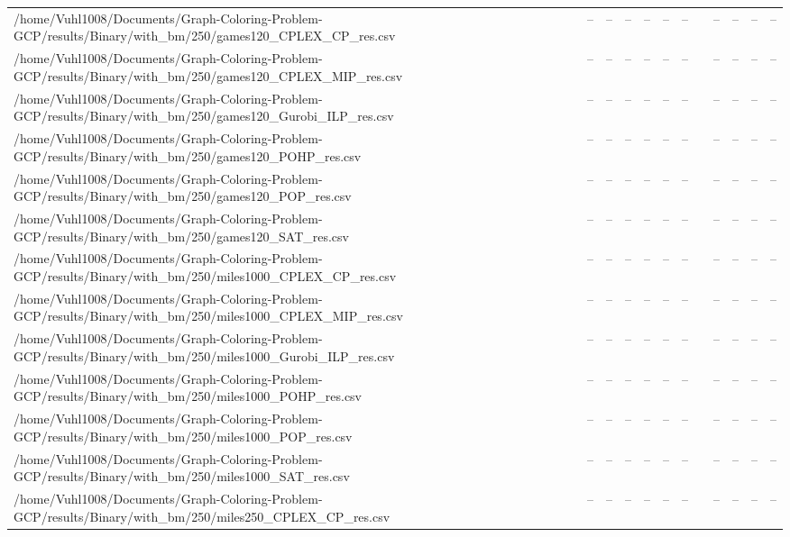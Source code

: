 \begin{table}[htbp]
\begin{tabular}{llllllllllll}
/home/Vuhl1008/Documents/Graph-Coloring-Problem-GCP/results/Binary/with\_bm/250/games120\_CPLEX\_CP\_res.csv & -- & -- & -- & -- & -- & -- & {} & -- & -- & -- & -- \\
/home/Vuhl1008/Documents/Graph-Coloring-Problem-GCP/results/Binary/with\_bm/250/games120\_CPLEX\_MIP\_res.csv & -- & -- & -- & -- & -- & -- & {} & -- & -- & -- & -- \\
/home/Vuhl1008/Documents/Graph-Coloring-Problem-GCP/results/Binary/with\_bm/250/games120\_Gurobi\_ILP\_res.csv & -- & -- & -- & -- & -- & -- & {} & -- & -- & -- & -- \\
/home/Vuhl1008/Documents/Graph-Coloring-Problem-GCP/results/Binary/with\_bm/250/games120\_POHP\_res.csv & -- & -- & -- & -- & -- & -- & {} & -- & -- & -- & -- \\
/home/Vuhl1008/Documents/Graph-Coloring-Problem-GCP/results/Binary/with\_bm/250/games120\_POP\_res.csv & -- & -- & -- & -- & -- & -- & {} & -- & -- & -- & -- \\
/home/Vuhl1008/Documents/Graph-Coloring-Problem-GCP/results/Binary/with\_bm/250/games120\_SAT\_res.csv & -- & -- & -- & -- & -- & -- & {} & -- & -- & -- & -- \\
/home/Vuhl1008/Documents/Graph-Coloring-Problem-GCP/results/Binary/with\_bm/250/miles1000\_CPLEX\_CP\_res.csv & -- & -- & -- & -- & -- & -- & {} & -- & -- & -- & -- \\
/home/Vuhl1008/Documents/Graph-Coloring-Problem-GCP/results/Binary/with\_bm/250/miles1000\_CPLEX\_MIP\_res.csv & -- & -- & -- & -- & -- & -- & {} & -- & -- & -- & -- \\
/home/Vuhl1008/Documents/Graph-Coloring-Problem-GCP/results/Binary/with\_bm/250/miles1000\_Gurobi\_ILP\_res.csv & -- & -- & -- & -- & -- & -- & {} & -- & -- & -- & -- \\
/home/Vuhl1008/Documents/Graph-Coloring-Problem-GCP/results/Binary/with\_bm/250/miles1000\_POHP\_res.csv & -- & -- & -- & -- & -- & -- & {} & -- & -- & -- & -- \\
/home/Vuhl1008/Documents/Graph-Coloring-Problem-GCP/results/Binary/with\_bm/250/miles1000\_POP\_res.csv & -- & -- & -- & -- & -- & -- & {} & -- & -- & -- & -- \\
/home/Vuhl1008/Documents/Graph-Coloring-Problem-GCP/results/Binary/with\_bm/250/miles1000\_SAT\_res.csv & -- & -- & -- & -- & -- & -- & {} & -- & -- & -- & -- \\
/home/Vuhl1008/Documents/Graph-Coloring-Problem-GCP/results/Binary/with\_bm/250/miles250\_CPLEX\_CP\_res.csv & -- & -- & -- & -- & -- & -- & {} & -- & -- & -- & -- \\

\end{tabular}
\end{table}
